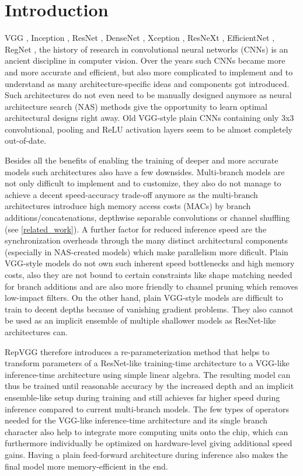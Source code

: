 \section{Introduction} \label{introduction}

VGG \cite{KarenSimonyan.2014}, Inception \cite{ChristianSzegedy.2014}, ResNet \cite{KaimingHe.2015}, DenseNet \cite{GaoHuang.2016}, Xception \cite{FrancoisChollet.2017}, ResNeXt \cite{SainingXie.2017}, EfficientNet \cite{LeMingxingTan.2019}, RegNet \cite{IlijaRadosavovic.2020}, the history of research in convolutional neural networks (CNNs) is an ancient discipline in computer vision. Over the years such CNNs became more and more accurate and efficient, but also more complicated to implement and to understand as many architecture-specific ideas and components got introduced. Such architectures do not even need to be manually designed anymore as neural architecture search (NAS) methods give the opportunity to learn optimal architectural designs right away. Old VGG-style plain CNNs containing only 3x3 convolutional, pooling and ReLU activation layers seem to be almost completely out-of-date. 

Besides all the benefits of enabling the training of deeper and more accurate models such architectures also have a few downsides. Multi-branch models are not only difficult to implement and to customize, they also do not manage to achieve a decent speed-accuracy trade-off anymore as the multi-branch architectures introduce high memory access costs (MACs) by branch additions/concatenations, depthwise separable convolutions or channel shuffling (see \autoref{related_work}). A further factor for reduced inference speed are the synchronization overheads through the many distinct architectural components (especially in NAS-created models) which make parallelism more dificult. Plain VGG-style models do not own such inherent speed bottlenecks and high memory costs, also they are not bound to certain constraints like shape matching needed for branch additions and are also more friendly to channel pruning \cite{HaoLi.2017} which removes low-impact filters. On the other hand, plain VGG-style models are difficult to train to decent depths because of vanishing gradient problems. They also cannot be used as an implicit ensemble of multiple shallower models as ResNet-like architectures can. 

RepVGG therefore introduces a re-parameterization method that helps to transform parameters of a ResNet-like training-time architecture to a VGG-like inference-time architecture using simple linear algebra. The resulting model can thus be trained until reasonable accuracy by the increased depth and an implicit ensemble-like setup during training and still achieves far higher speed during inference compared to current multi-branch models. The few types of operators needed for the VGG-like inference-time architecture and its single branch character also help to integrate more computing units onto the chip, which can furthermore individually be optimized on hardware-level giving additional speed gains. Having a plain feed-forward architecture during inference also makes the final model more memory-efficient in the end. 

